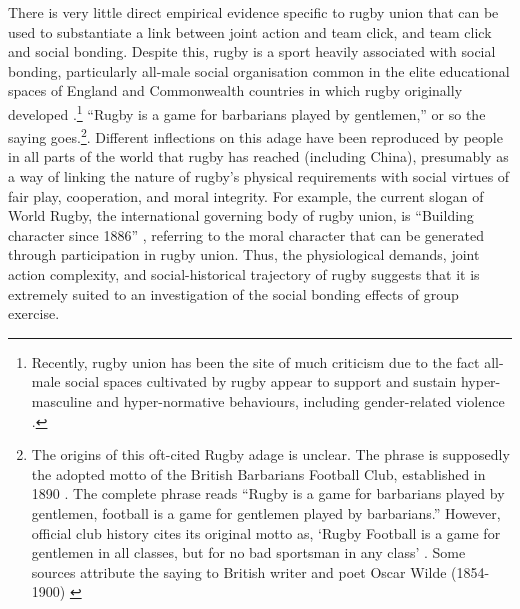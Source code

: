 There is very little direct empirical evidence specific to rugby union that can be used to substantiate a link between joint action and team click, and team click and social bonding.  Despite this, rugby is a sport heavily associated with social bonding, particularly all-male social organisation common in the elite educational spaces of England and Commonwealth countries in which rugby originally developed \citep{Dunning2005,Richards2007,Collins2008}.\footnote{Recently, rugby union has been the site of much criticism due to the fact all-male social spaces cultivated by rugby appear to support and sustain hyper-masculine and hyper-normative behaviours, including gender-related violence \citep{Cosslett2014}.
}   ``Rugby is a game for barbarians played by gentlemen,'' or so the saying goes.\footnote{The origins of this oft-cited Rugby adage is unclear.  The phrase is supposedly the adopted motto of the British Barbarians Football Club, established in 1890 \citep[34]{Dunning2005}.  The complete phrase reads ``Rugby is a game for barbarians played by gentlemen, football is a game for gentlemen played by barbarians.''  However, official club history cites its original motto as, ‘Rugby Football is a game for gentlemen in all classes, but for no bad sportsman in any class' \citep[vii]{Starmer-Smith1977}.  Some sources attribute the saying to British writer and poet Oscar Wilde (1854-1900) \citep{Fleenor2015}}. Different inflections on this adage have been reproduced by people in all parts of the world that rugby has reached (including China), presumably as a way of linking the nature of rugby's physical requirements with social virtues of fair play, cooperation, and moral integrity.
For example, the current slogan of World Rugby, the international governing body of rugby union, is ``Building character since 1886'' \citep{WorldRugby2017}, referring to the moral character that can be generated through participation in rugby union.  Thus, the physiological demands, joint action complexity, and social-historical trajectory of rugby suggests that it is extremely suited to an investigation of the social bonding effects of group exercise.
















